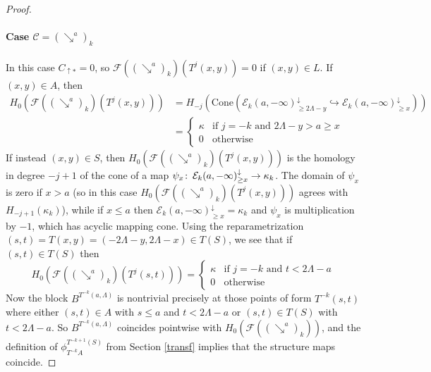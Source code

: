 \documentclass[11pt]{amsart}
\theoremstyle{definition}
\theoremstyle{remark}
\numberwithin{equation}{section}
\def\co{\colon\thinspace}
\begin{document}
\begin{proof}
\paragraph{\textbf{Case} $\mathcal{C}=(\searrow^a)_k$} In this case $C_{\uparrow *}=0$, so $\mathcal{F}((\searrow^a)_k)(T^{j}(x,y))=0$ if $(x,y)\in L$.  If $(x,y)\in A$, then \begin{align*} H_0\left(\mathcal{F}((\searrow^a)_k)(T^{j}(x,y)) \right)&= H_{-j}\left(\mathrm{Cone}(\mathcal{E}_k(a,-\infty)^{\downarrow}_{\geq 2\Lambda-y}\hookrightarrow \mathcal{E}_k(a,-\infty)^{\downarrow}_{\geq x})\right)\\&=\left\{\begin{array}{ll}\kappa & \mbox{if }j=-k\mbox{ and }2\Lambda-y>a\geq x \\ 0 & \mbox{otherwise} \end{array}\right. 
\end{align*}
If instead $(x,y)\in S$, then $ H_0\left(\mathcal{F}((\searrow^a)_k)(T^{j}(x,y)) \right)$ is the homology in degree $-j+1$ of the cone of a map $\psi_x\co \mathcal{E}_k(a,-\infty)^{\downarrow}_{\geq x}\to\kappa_k$.  The domain of $\psi_x$ is zero if $x>a$ (so in this case $H_0\left(\mathcal{F}((\searrow^a)_k)(T^{j}(x,y)) \right)$ agrees with $H_{-j+1}(\kappa_k)$), while if $x\leq a$ then 
$\mathcal{E}_k(a,-\infty)^{\downarrow}_{\geq x}=\kappa_k$ and $\psi_x$ is multiplication by $-1$, which has acyclic mapping cone. Using the reparametrization
 $(s,t)=T(x,y)=(-2\Lambda-y,2\Lambda-x)\in T(S)$, we see that if $(s,t)\in T(S)$ then 
 \[ H_0\left(\mathcal{F}((\searrow^a)_k)(T^{j}(s,t))\right)=\left\{ \begin{array}{ll} \kappa &\mbox{if }j=-k\mbox{ and }t<2\Lambda-a \\ 0 & \mbox{otherwise} \end{array}\right.  \]  Now the block $B^{T^{-k}(a,\Lambda)}$ is nontrivial precisely at those points of form $T^{-k}(s,t)$ where either $(s,t)\in A$ with $s\leq a$ and $t<2\Lambda-a$ or $(s,t)\in T(S)$ with $t<2\Lambda-a$.  So $B^{T^{-k}(a,\Lambda)}$ coincides pointwise with $H_0\left(\mathcal{F}((\searrow^a)_k)\right)$, and the definition of $\phi_{T^{-k}A}^{T^{-k+1}(S)}$ from Section \ref{transf} implies that the structure maps coincide.


\end{proof}
\end{document}
